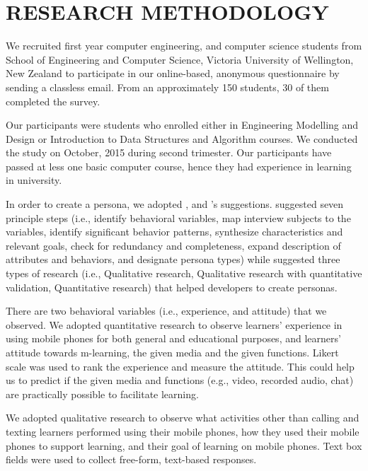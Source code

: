 \documentclass[a4paper,twoside]{article}
\begin{document}
 
\section{RESEARCH METHODOLOGY}

\noindent We recruited first year computer engineering, and computer science students from School of Engineering and Computer Science, Victoria University of Wellington, New Zealand to participate in our online-based, anonymous questionnaire by sending a classless email. From an approximately 150 students, 30 of them completed the survey. 

Our participants were students who enrolled either in Engineering Modelling and Design or Introduction to Data Structures and Algorithm courses. We conducted the study on October, 2015 during second trimester. Our participants have passed at less one basic computer course, hence they had experience in learning in university. 

In order to create a persona, we adopted \citet{cooper2007face}, and \citet{mulder2006user}'s suggestions. \citet{cooper2007face} suggested seven principle steps (i.e., identify behavioral variables, map interview subjects to the variables, identify significant behavior patterns, synthesize characteristics and relevant goals, check for redundancy and completeness, expand description of attributes and behaviors, and designate persona types) while \citet{mulder2006user} suggested three types of research (i.e., Qualitative research, Qualitative research with quantitative validation, Quantitative research) that helped developers to create personas. 

There are two behavioral variables (i.e., experience, and attitude) that we observed. We adopted quantitative research to observe learners' experience in using mobile phones for both general and educational purposes, and learners' attitude towards m-learning, the given media and the given functions. Likert scale was used to rank the experience and measure the attitude. This could help us to predict if the given media and functions (e.g., video, recorded audio, chat) are practically possible to facilitate learning. 

We adopted qualitative research to observe what activities other than calling and texting learners performed using their mobile phones, how they used their mobile phones to support learning, and their goal of learning on mobile phones. Text box fields were used to collect free-form, text-based responses. 
\end{document}
